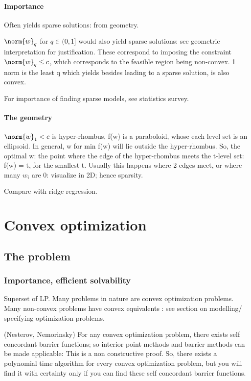 \documentclass[oneside, article]{memoir}
\begin{document}
\subsection{Importance}
Often yields sparse solutions: from geometry.

$\norm{w}_q$ for $q \in (0, 1]$ would also yield sparse solutions: see geometric interpretation for justification. These correspond to imposing the constraint $\norm{w}_q \leq c$, which corresponds to the feasible region being non-convex. 1 norm is the least q which yields besides leading to a sparse solution, is also convex.

For importance of finding sparse models, see statistics survey.

\subsection{The geometry}
$\norm{w}_{1} < c$ is hyper-rhombus, f(w) is a paraboloid, whose each level set is an ellipsoid. In general, w for min f(w) will lie outside the hyper-rhombus. So, the optimal w: the point where the edge of the hyper-rhombus meets the t-level set: f(w) = t, for the smallest t. Usually this happens where 2 edges meet, or where many $w_{i}$ are 0: visualize in 2D; hence sparsity.

Compare with ridge regression.

\part{Convex optimization}
\chapter{The problem}
\section{Importance, efficient solvability}
Superset of LP. Many problems in nature are convex optimization problems. Many non-convex problems have convex equivalents : see section on modelling/ specifying optimization problems.

(Nesterov, Nemorinsky) For any convex optimization problem, there exists self concordant barrier functions; so interior point methods and barrier methods can be made applicable: This is a non constructive proof. So, there exists a polynomial time algorithm for every convex optimization problem, but you will find it with certainty only if you can find these self concordant barrier functions.
\end{document}
